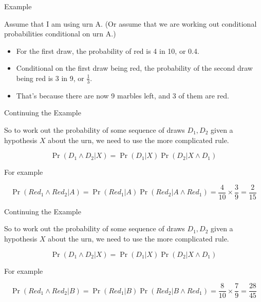 \documentclass[
  ignorenonframetext,
]{beamer}
\providecommand{\tightlist}{%
  \setlength{\itemsep}{0pt}\setlength{\parskip}{0pt}}
\renewcommand{\,}{\text{, }}
\begin{document}
\begin{frame}{Example}
\protect\hypertarget{example-1}{}

Assume that I am using urn A. (Or assume that we are working out
conditional probabilities conditional on urn A.)

\begin{itemize}
\tightlist
\item
  For the first draw, the probability of red is 4 in 10, or 0.4.
\item
  Conditional on the first draw being red, the probability of the second
  draw being red is 3 in 9, or \(\frac{1}{3}\).
\item
  That's because there are now 9 marbles left, and 3 of them are red.
\end{itemize}

\end{frame}

\begin{frame}{Continuing the Example}
\protect\hypertarget{continuing-the-example}{}

So to work out the probability of some sequence of draws \(D_1, D_2\)
given a hypothesis \(X\) about the urn, we need to use the more
complicated rule.

\[
\Pr(D_1 \wedge D_2 | X) = \Pr(D_1 | X) \Pr(D_2 | X \wedge D_1)
\]

\pause

For example

\[
\Pr(Red_1 \wedge Red_2 | A) = \Pr(Red_1 | A)\Pr(Red_2 | A \wedge Red_1) = \frac{4}{10} \times \frac{3}{9} = \frac{2}{15}
\]

\end{frame}

\begin{frame}{Continuing the Example}
\protect\hypertarget{continuing-the-example-1}{}

So to work out the probability of some sequence of draws \(D_1, D_2\)
given a hypothesis \(X\) about the urn, we need to use the more
complicated rule.

\[
\Pr(D_1 \wedge D_2 | X) = \Pr(D_1 | X) \Pr(D_2 | X \wedge D_1)
\]

For example

\[
\Pr(Red_1 \wedge Red_2 | B) = \Pr(Red_1 | B)\Pr(Red_2 | B \wedge Red_1) = \frac{8}{10} \times \frac{7}{9} = \frac{28}{45}
\]

\end{frame}
\end{document}
